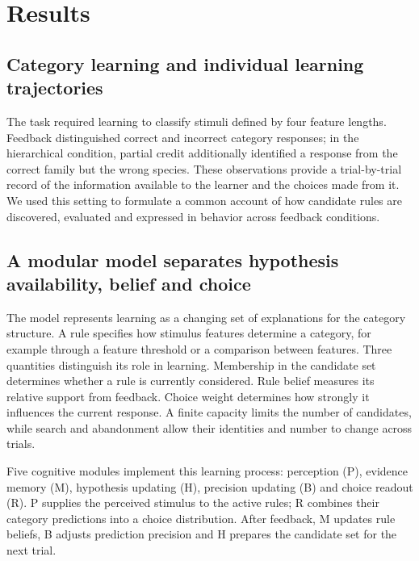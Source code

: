 \section*{Results}\label{sec:results}

\subsection*{Category learning and individual learning trajectories}
\label{r:task}\label{r:behavior}

The task required learning to classify stimuli defined by four feature
lengths. Feedback distinguished correct and incorrect category responses;
in the hierarchical condition, partial credit additionally identified a
response from the correct family but the wrong species. These observations
provide a trial-by-trial record of the information available to the learner
and the choices made from it. We used this setting to formulate a common
account of how candidate rules are discovered, evaluated and expressed in
behavior across feedback conditions.


\subsection*{A modular model separates hypothesis availability, belief and choice}
\label{r:model}

The model represents learning as a changing set of explanations for the
category structure. A rule specifies how stimulus features determine a
category, for example through a feature threshold or a comparison between
features. Three quantities distinguish its role in learning. Membership in
the candidate set determines whether a rule is currently considered. Rule
belief measures its relative support from feedback. Choice weight determines
how strongly it influences the current response. A finite capacity limits
the number of candidates, while search and abandonment allow their identities
and number to change across trials.

Five cognitive modules implement this learning process: perception (P),
evidence memory (M), hypothesis updating (H), precision updating (B) and
choice readout (R). P supplies the perceived stimulus to the active rules;
R combines their category predictions into a choice distribution. After
feedback, M updates rule beliefs, B adjusts prediction precision and H
prepares the candidate set for the next trial.

